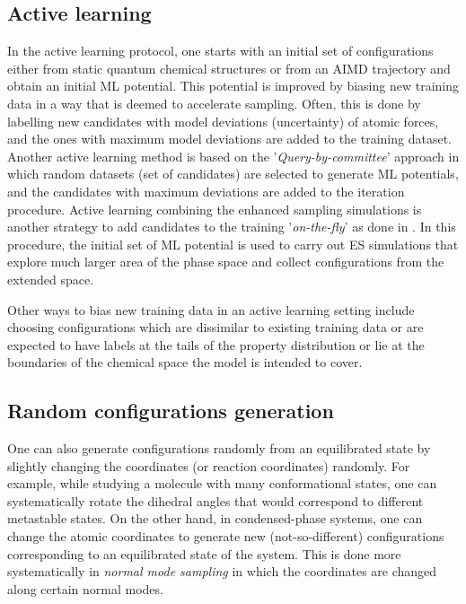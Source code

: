 \documentclass[9pt,bestpractices]{livecoms}
\begin{document}
\subsection{Active learning}
In the active learning protocol, one starts with an initial set of
configurations either from static quantum chemical structures or from an AIMD
trajectory and obtain an initial ML potential. This potential is improved by biasing new training data in a way that is deemed to accelerate sampling. Often, this is done by labelling new candidates
with model deviations (uncertainty) of atomic forces, and the ones with maximum
model deviations are added to the training dataset. Another active learning
method is based on the '{\em Query-by-committee}' approach in which random
datasets (set of candidates) are selected to generate ML potentials, and the
candidates with maximum deviations are added to the iteration procedure. Active
learning combining the enhanced sampling simulations is another strategy to add
candidates to the training '{\em on-the-fly}' as done in \cite{thompsonOptimizingActiveLearning2022}. In this
procedure, the initial set of ML potential is used to carry out ES simulations
that explore much larger area of the phase space and collect configurations from
the extended space.

Other ways to bias new training data in an active learning setting include choosing configurations which are dissimilar to existing training data or are expected to have labels at the tails of the property distribution or lie at the boundaries of the chemical space the model is intended to cover.






\subsection{Random configurations generation}
One can also generate configurations randomly from an equilibrated state by
slightly changing the coordinates (or reaction coordinates) randomly. For example, while studying a molecule with many conformational
states, one can systematically rotate the dihedral angles that would correspond
to different metastable states. On the other hand, in condensed-phase systems,
one can change the atomic coordinates to generate new (not-so-different)
configurations corresponding to an equilibrated state of the system. This is
done more systematically in {\em normal mode sampling} in which the coordinates
are changed along certain normal modes.
\end{document}

